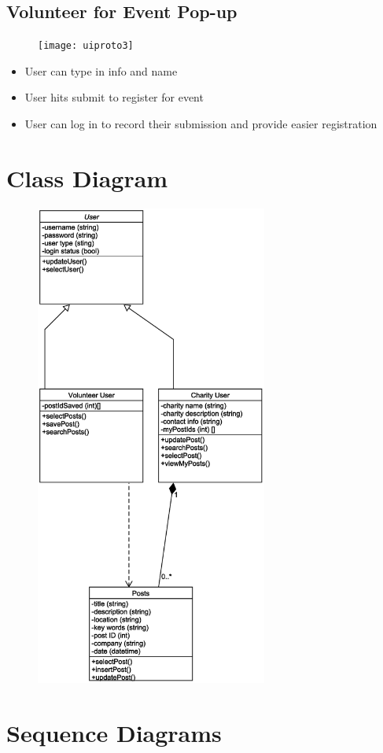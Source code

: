 \documentclass[12pt]{article}
\begin{document}
\subsection{Volunteer for Event Pop-up}
\begin{figure}[h!]
\texttt{[image: uiproto3]}
\end{figure}
\begin{itemize}
\item
	User can type in info and name
\item
	User hits submit to register for event
\item
	User can log in to record their submission and provide easier registration
\end{itemize}
\pagebreak
\section{Class Diagram}
\begin{figure}[h!]
\includegraphics[width=3in]{classdiagram}
\end{figure}
\pagebreak
\section{Sequence Diagrams}
\end{document}
